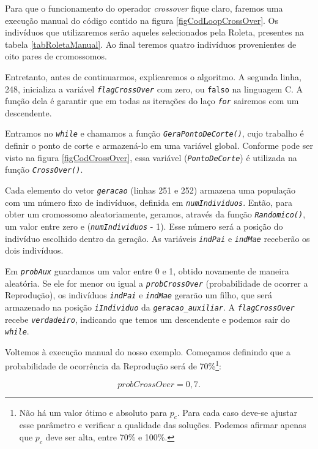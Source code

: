 	Para que o funcionamento do operador \textit{crossover} fique claro, faremos uma execução manual do código contido na figura \ref{figCodLoopCrossOver}. Os indivíduos que utilizaremos serão aqueles selecionados pela Roleta, presentes na tabela \ref{tabRoletaManual}. Ao final teremos quatro indivíduos provenientes de oito pares de cromossomos.
	
	Entretanto, antes de continuarmos, explicaremos o algoritmo.	A segunda linha, 248, inicializa a variável \textit{\texttt{flagCrossOver}} com zero, ou \texttt{falso} na linguagem C. A função dela é garantir que em todas as iterações do laço \textit{\texttt{for}} sairemos com um descendente.
	
	Entramos no \textit{\texttt{while}} e chamamos a função \textit{\texttt{GeraPontoDeCorte()}}, cujo trabalho é definir o ponto de corte e armazená-lo em uma variável global. Conforme pode ser visto na figura \ref{figCodCrossOver}, essa variável (\textit{\texttt{PontoDeCorte}}) é utilizada na função \textit{\texttt{CrossOver()}}.
	
	Cada elemento do vetor \textit{\texttt{geracao}} (linhas 251 e 252) armazena uma população com um número fixo de indivíduos, definida em \textit{\texttt{numIndividuos}}. Então, para obter um cromossomo aleatoriamente, geramos, através da função \textit{\texttt{Randomico()}}, um valor entre zero e (\textit{\texttt{numIndividuos}} - 1). Esse número será a posição do indivíduo escolhido dentro da geração. 	As variáveis \textit{\texttt{indPai}} e \textit{\texttt{indMae}} receberão os dois indivíduos. 
	
	Em \textit{\texttt{probAux}} guardamos um valor entre 0 e 1, obtido novamente de maneira aleatória. Se ele for menor ou igual a \textit{\texttt{probCrossOver}} (probabilidade de ocorrer a Reprodução), os indivíduos \textit{\texttt{indPai}} e \textit{\texttt{indMae}} gerarão um filho, que será armazenado na posição \textit{\texttt{iIndividuo}} da \textit{\texttt{geracao\_auxiliar}}. A \textit{\texttt{flagCrossOver}} recebe \textit{\texttt{verdadeiro}}, indicando que temos um descendente e podemos sair do \textit{\texttt{while}}.
	
	Voltemos à execução manual do nosso exemplo. Começamos definindo que a probabilidade de ocorrência da Reprodução será de 70\%\footnote{Não há um valor ótimo e absoluto para $p_c$. Para cada caso deve-se ajustar esse parâmetro e verificar a qualidade das soluções. Podemos afirmar apenas que $p_c$ deve ser alta, entre 70\% e 100\%.}:
	
	$$
		probCrossOver = 0,7.
	$$	
	
